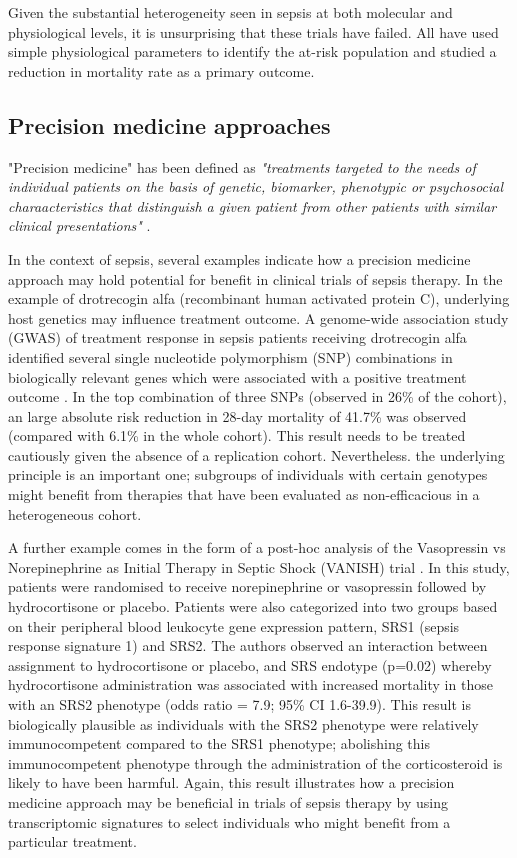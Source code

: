 Given the substantial heterogeneity seen in sepsis at both molecular and physiological levels, it is unsurprising that these trials have failed. All have used simple physiological parameters to identify the at-risk population and studied a reduction in mortality rate as a primary outcome. 

\subsection{Precision medicine approaches}
"Precision medicine" has been defined as \textit{"treatments targeted to the needs of individual patients on the basis of genetic, biomarker, phenotypic or psychosocial charaacteristics that distinguish a given patient from other patients with similar clinical presentations"} \parencite{Jameson2015}. 

In the context of sepsis, several examples indicate how a precision medicine approach may hold potential for benefit in clinical trials of sepsis therapy. In the example of drotrecogin alfa (recombinant human activated protein C), underlying host genetics may influence treatment outcome. A genome-wide association study (GWAS) of treatment response in sepsis patients receiving drotrecogin alfa identified several single nucleotide polymorphism (SNP) combinations in biologically relevant genes which were associated with a positive treatment outcome \parencite{Man2013}. In the top combination of three SNPs (observed in 26\% of the cohort), an large absolute risk reduction in 28-day mortality of 41.7\% was observed (compared with 6.1\% in the whole cohort). This result needs to be treated cautiously given the absence of a replication cohort. Nevertheless. the underlying principle is an important one; subgroups of individuals with certain genotypes might benefit from therapies that have been evaluated as non-efficacious in a heterogeneous cohort. 

A further example comes in the form of a post-hoc analysis of the Vasopressin vs Norepinephrine as Initial Therapy in Septic Shock (VANISH) trial \parencite{Antcliffe2019}. In this study, patients were randomised to receive norepinephrine or vasopressin followed by hydrocortisone or placebo. Patients were also categorized into two groups based on their peripheral blood leukocyte gene expression pattern, SRS1 (sepsis response signature 1) and SRS2. The authors observed an interaction between assignment to hydrocortisone or placebo, and SRS endotype (p=0.02) whereby hydrocortisone administration was associated with increased mortality in those with an SRS2 phenotype (odds ratio = 7.9; 95\% CI 1.6-39.9). This result is biologically plausible as individuals with the SRS2 phenotype were relatively immunocompetent compared to the SRS1 phenotype; abolishing this immunocompetent phenotype through the administration of the corticosteroid is likely to have been harmful. Again, this result illustrates how a precision medicine approach may be beneficial in trials of sepsis therapy by using transcriptomic signatures to select individuals who might benefit from a particular treatment.

